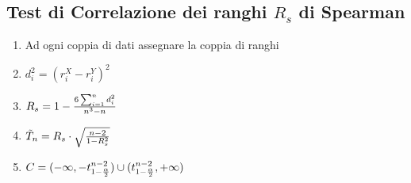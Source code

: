 \documentclass[12pt]{article}
\begin{document}
    \subsection{Test di Correlazione dei ranghi $R_s$ di Spearman}
    \begin{enumerate}
        \item Ad ogni coppia di dati assegnare la coppia di ranghi
        \item $d_i^2 = (r_i^X - r_i^Y)^2$
        \item $R_s = 1 - {{6\sum_{i = 1}^n d_i^2}\over{n^3 - n}}$
        \item $\tilde{T}_n = R_s \cdot \sqrt{{n-2}\over{1- R_s^2}}$
        \item $C = (-\infty, -t_{1-{\alpha \over 2}}^{n-2}) \cup (t_{1-{\alpha \over 2}}^{n-2}, +\infty)$
    \end{enumerate}
\end{document}
